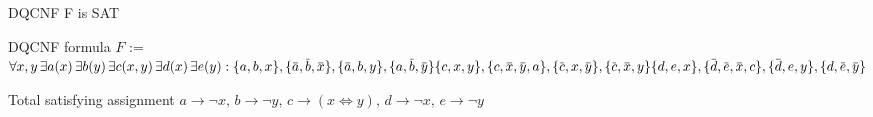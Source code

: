 \documentclass[xcolor=table	]{beamer}
\newcommand{\ov}[1]{\mkern 1.5mu\overline{\mkern-1.5mu#1\mkern-1.5mu}\mkern 1.5mu}
\begin{document}
\begin{frame}{DQCNF F is SAT}
\begin{alertblock}{DQCNF formula} {
			$F$ :=	$ \forall x, y \, \exists a(x) \, \exists  b(y) \, \exists c(x,y) \, \exists d(x) \, \exists e(y) :
			\{a,b,x\}, \{\ov{a},\ov{b},\ov{x}\}, \{\ov{a},b,y\}, \{a,\ov{b},\ov{y}\}  \newline 
			\{c,x,y\}, \{c,\ov{x},\ov{y}, a\}, \{\ov{c},x,\ov{y}\}, \{\ov{c},\ov{x},y\} \newline 
			\{d,e,x\}, \{\ov{d},\ov{e},\ov{x}, c\}, \{\ov{d},e,y\}, \{d,\ov{e},\ov{y}\} $
		}
\end{alertblock}
\pause 
	\begin{exampleblock}{Total satisfying assignment} {
			$ a \to \neg x, \, b \to \neg y, \, c \to (x \Leftrightarrow  y), \, d \to \neg x, \, e \to \neg y$
		}
    \end{exampleblock} 
\end{frame}

%
%
%
%

%
% 
% 
%
% 
\end{document}

